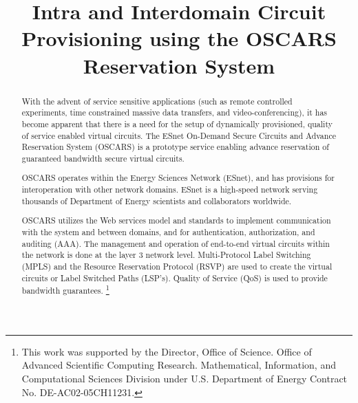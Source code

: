 \documentclass[conference]{IEEEtran}
\begin{document}
\title{Intra and Interdomain Circuit Provisioning using the OSCARS Reservation System}

% 
\author{
}

\maketitle

\begin{abstract}
With the advent of service sensitive applications (such as remote controlled 
experiments, time constrained massive data transfers, and video-conferencing),
it has become apparent that there is a need for the setup of dynamically 
provisioned, quality of service enabled virtual circuits.
The ESnet On-Demand Secure Circuits and Advance Reservation System (OSCARS) is 
a prototype service enabling advance reservation of guaranteed bandwidth 
secure virtual circuits.

OSCARS operates within the Energy Sciences Network (ESnet), and has
provisions for interoperation with other network domains.
ESnet is a high-speed network serving thousands 
of Department of Energy scientists and collaborators worldwide.

OSCARS utilizes the Web services model and standards to implement communication
with the system and between domains, and for authentication, authorization,
and auditing (AAA).  The management and operation of end-to-end virtual 
circuits within the network is done at the layer 3 network level.  
Multi-Protocol Label Switching (MPLS) and the Resource Reservation Protocol 
(RSVP)
are used to create the virtual circuits or Label Switched Paths (LSP's). 
Quality of Service (QoS) is used to provide bandwidth guarantees.
\footnote{
This work was supported by the Director, Office of Science. Office of
Advanced Scientific Computing Research. Mathematical, Information, and
Computational Sciences Division under U.S. Department of
Energy Contract No. DE-AC02-05CH11231.
}
\end{abstract}
\end{document}
